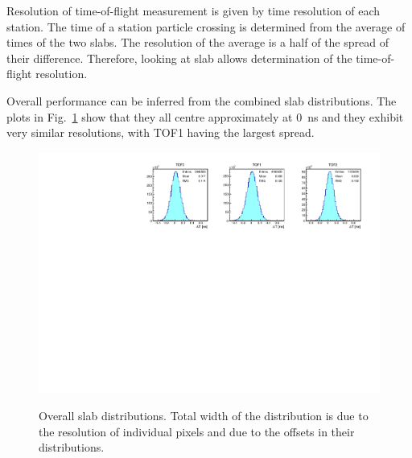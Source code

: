 Resolution of time-of-flight measurement is given by time resolution
of each station. The time of a station particle crossing is determined
from the average of times of the two slabs. The resolution of the
average is a half of the spread of their difference. Therefore,
looking at slab \DT{} allows determination of the time-of-flight
resolution.


Overall performance can be inferred from the combined slab \DT{}
distributions. The plots in Fig.~\ref{fig:SlabDtAll} show that they all centre
approximately at 0~ns and they exhibit very similar resolutions, with TOF1
having the largest spread.


\begin{figure}
  \begin{center}
  \includegraphics[width=0.9\columnwidth]{07_overall_slab_dt} \\
  \caption{Overall slab \DT{} distributions. Total width of the
    distribution is due to the resolution of individual pixels and due to
    the offsets in their \DT{} distributions.}
  \label{fig:SlabDtAll}
  \end{center}
\end{figure}


